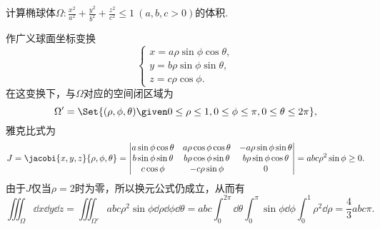 \begin{example}\label{example:三重积分.椭球体的体积}
计算椭球体\(\Omega: \frac{x^2}{a^2}+\frac{y^2}{b^2}+\frac{z^2}{c^2}\leq1\ (a,b,c>0)\)的体积.
\begin{solution}
作广义球面坐标变换\begin{equation*}
	\left\{ \begin{array}{l}
		x = a \rho \sin\phi \cos\theta, \\
		y = b \rho \sin\phi \sin\theta, \\
		z = c \rho \cos\phi.
	\end{array} \right.
\end{equation*}
在这变换下，与\(\Omega\)对应的空间闭区域为\begin{equation*}
	\Omega' = \Set{
		(\rho,\phi,\theta)
		\given
		0 \leq \rho \leq 1,
		0 \leq \phi \leq \pi,
		0 \leq \theta \leq 2\pi
	},
\end{equation*}
雅克比式为\begin{equation*}
	J = \jacobi{x,y,z}{\rho,\phi,\theta}
	= \begin{vmatrix}
		a \sin\phi \cos\theta & a \rho \cos\phi \cos\theta & -a \rho \sin\phi \sin\theta \\
		b \sin\phi \sin\theta & b \rho \cos\phi \sin\theta & b \rho \sin\phi \cos\theta \\
		c \cos\phi & -c \rho \sin\phi & 0
	\end{vmatrix}
	= abc \rho^2 \sin\phi
	\geq 0.
\end{equation*}
由于\(J\)仅当\(\rho=2\)时为零，所以换元公式仍成立，从而有\begin{equation*}
	\iiint_\Omega \dd{x}\dd{y}\dd{z}
	= \iiint_{\Omega'} abc \rho^2 \sin\phi \dd{\rho} \dd{\phi} \dd{\theta}
	= abc \int_0^{2\pi} \dd{\theta}
	\int_0^\pi \sin\phi \dd{\phi}
	\int_0^1 \rho^2 \dd{\rho}
	= \frac43 abc\pi.
\end{equation*}
\end{solution}
\end{example}

